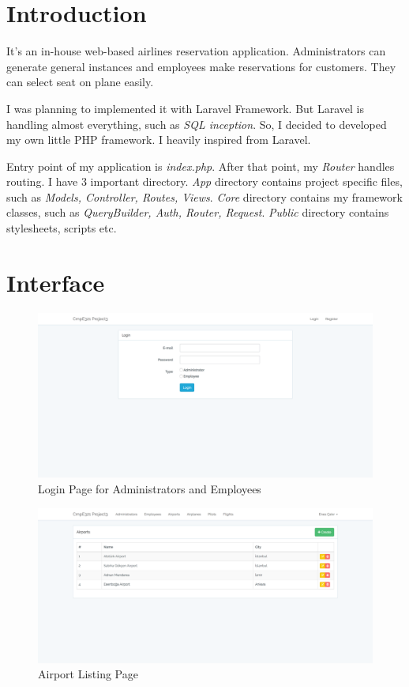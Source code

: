 \documentclass[12pt,a4paper]{article}
\begin{document}
\break

\section{Introduction}
    It's an in-house web-based airlines reservation application. Administrators can generate general instances and employees make reservations for customers. They can select seat on plane easily.

    I was planning to implemented it with Laravel Framework. But Laravel is handling almost everything, such as \emph{SQL inception}. So, I decided to developed my own little PHP framework. I heavily inspired from Laravel.

    Entry point of my application is \emph{index.php}. After that point, my \emph{Router} handles routing. I have 3 important directory. \emph{App} directory contains project specific files, such as \emph{Models, Controller, Routes, Views}. \emph{Core} directory contains my framework classes, such as \emph{QueryBuilder, Auth, Router, Request}. \emph{Public} directory contains stylesheets, scripts etc.

\section{Interface}
    \begin{figure}[h!]
    \centering
    \includegraphics[width=135mm]{cmpe321_p3_ss1.png}
    \caption{Login Page for Administrators and Employees}
    \label{fig:ss1}
    \end{figure}

    \begin{figure}[h!]
    \centering
    \includegraphics[width=135mm]{cmpe321_p3_ss2.png}
    \caption{Airport Listing Page}
    \label{fig:ss2}
    \end{figure}
\end{document}
